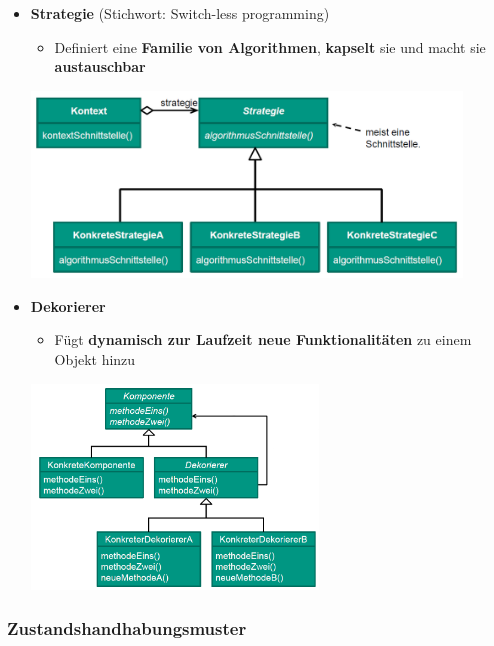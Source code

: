 \begin{itemize}
\begin{center}
\end{center}
\item \textbf{Strategie} (Stichwort: Switch-less programming)
\begin{itemize}
\item Definiert eine \textbf{Familie von Algorithmen}, \textbf{kapselt} sie und macht sie \textbf{austauschbar}
\end{itemize}
\begin{center}
\includegraphics[width=0.9\textwidth]{../images/strategie.png}
\end{center}
\newpage
\item \textbf{Dekorierer}
\begin{itemize}
\item Fügt \textbf{dynamisch zur Laufzeit neue Funktionalitäten} zu einem Objekt hinzu
\end{itemize}
\begin{center}
\includegraphics[width=0.6\textwidth]{../images/dekorierer.png}
\end{center}
\end{itemize}
			
\subsubsection{Zustandshandhabungsmuster}
			
